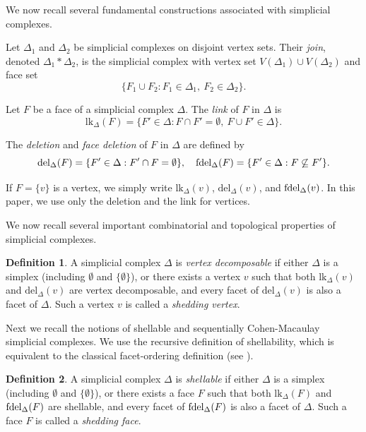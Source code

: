 \documentclass[12pt,reqno]{amsart}
\theoremstyle{definition}
\newtheorem{definition}[definition]{Definition}
\newcommand{\lk}{{\mathrm{lk}}}
\newcommand{\del}{{\mathrm{del}}}
\newcommand{\fdel}{{\rm fdel}}
\begin{document}
We now recall several fundamental constructions associated with simplicial complexes.

Let $\Delta_1$ and $\Delta_2$ be simplicial complexes on disjoint vertex sets. Their \emph{join}, denoted $\Delta_1 * \Delta_2$, is the simplicial complex with vertex set $V(\Delta_1)\cup V(\Delta_2)$ and face set
\[
\{F_1 \cup F_2 : F_1 \in \Delta_1,\ F_2 \in \Delta_2\}.
\]

Let $F$ be a face of a simplicial complex $\Delta$. The \emph{link} of $F$ in $\Delta$ is
\[
\lk_\Delta(F)=\{F' \in \Delta : F\cap F'=\emptyset,\ F\cup F' \in \Delta\}.
\]

The \emph{deletion} and \emph{face deletion} of $F$ in $\Delta$ are defined by
\[
\del_\Delta(F)=\{F' \in \Delta : F'\cap F=\emptyset\},
\quad
\fdel_\Delta(F)=\{F' \in \Delta : F \not\subseteq F'\}.
\]

If $F=\{v\}$ is a vertex, we simply write $\lk_\Delta(v)$, $\del_\Delta(v)$, and $\fdel_\Delta(v)$.
In this paper, we use only the deletion and the link for vertices.

\medskip

We now recall several important combinatorial and topological properties of simplicial complexes.

\begin{definition}\label{def:VD}
A simplicial complex $\Delta$ is \emph{vertex decomposable} if either $\Delta$ is a simplex (including $\emptyset$ and $\{\emptyset\}$), or there exists a vertex $v$ such that both $\lk_{\Delta}(v)$ and $\del_{\Delta}(v)$ are vertex decomposable, and every facet of $\del_{\Delta}(v)$ is also a facet of $\Delta$. Such a vertex $v$ is called a \emph{shedding vertex}.
\end{definition}

\medskip

Next we recall the notions of shellable and sequentially Cohen-Macaulay simplicial complexes.
We use the recursive definition of shellability, which is equivalent to the classical facet-ordering definition (see \cite[Chapter 3]{JJ08}).

\begin{definition}\label{def:shellable}
A simplicial complex $\Delta$ is \emph{shellable} if either $\Delta$ is a simplex (including $\emptyset$ and $\{\emptyset\}$), or there exists a face $F$ such that both $\lk_{\Delta}(F)$ and $\fdel_{\Delta}(F)$ are shellable, and every facet of $\fdel_{\Delta}(F)$ is also a facet of $\Delta$. Such a face $F$ is called a \emph{shedding face}.
\end{definition}
\end{document}
